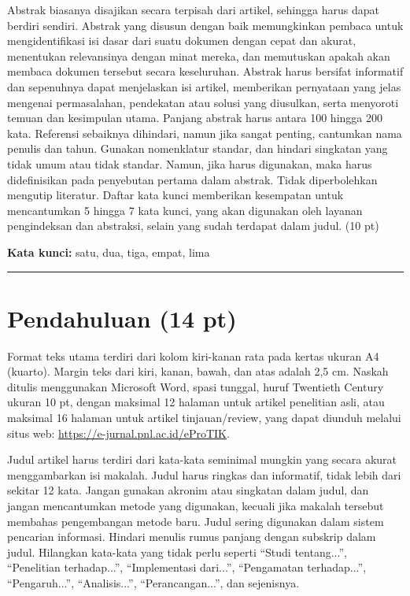 \documentclass[10pt,a4paper]{article}
\begin{document}
{\fontsize{10pt}{13pt}\selectfont
Abstrak biasanya disajikan secara terpisah dari artikel, sehingga harus dapat berdiri sendiri. Abstrak yang disusun dengan baik memungkinkan pembaca untuk mengidentifikasi isi dasar dari suatu dokumen dengan cepat dan akurat, menentukan relevansinya dengan minat mereka, dan memutuskan apakah akan membaca dokumen tersebut secara keseluruhan. Abstrak harus bersifat informatif dan sepenuhnya dapat menjelaskan isi artikel, memberikan pernyataan yang jelas mengenai permasalahan, pendekatan atau solusi yang diusulkan, serta menyoroti temuan dan kesimpulan utama. Panjang abstrak harus antara 100 hingga 200 kata. Referensi sebaiknya dihindari, namun jika sangat penting, cantumkan nama penulis dan tahun. Gunakan nomenklatur standar, dan hindari singkatan yang tidak umum atau tidak standar. Namun, jika harus digunakan, maka harus didefinisikan pada penyebutan pertama dalam abstrak. Tidak diperbolehkan mengutip literatur. Daftar kata kunci memberikan kesempatan untuk mencantumkan 5 hingga 7 kata kunci, yang akan digunakan oleh layanan pengindeksan dan abstraksi, selain yang sudah terdapat dalam judul. (10 pt)\par}

\vspace{5pt}
{\fontsize{10pt}{12pt}\selectfont\textbf{Kata kunci:} satu, dua, tiga, empat, lima\par}

\vspace{4pt}
\noindent\rule{\textwidth}{0.4pt}
\vspace{6pt}

\section{Pendahuluan (14 pt)}

Format teks utama terdiri dari kolom kiri-kanan rata pada kertas ukuran A4 (kuarto). Margin teks dari kiri, kanan, bawah, dan atas adalah 2,5 cm. Naskah ditulis menggunakan Microsoft Word, spasi tunggal, huruf Twentieth Century ukuran 10 pt, dengan maksimal 12 halaman untuk artikel penelitian asli, atau maksimal 16 halaman untuk artikel tinjauan/review, yang dapat diunduh melalui situs web: \url{https://e-jurnal.pnl.ac.id/eProTIK}.

Judul artikel harus terdiri dari kata-kata seminimal mungkin yang secara akurat menggambarkan isi makalah. Judul harus ringkas dan informatif, tidak lebih dari sekitar 12 kata. Jangan gunakan akronim atau singkatan dalam judul, dan jangan mencantumkan metode yang digunakan, kecuali jika makalah tersebut membahas pengembangan metode baru. Judul sering digunakan dalam sistem pencarian informasi. Hindari menulis rumus panjang dengan subskrip dalam judul. Hilangkan kata-kata yang tidak perlu seperti ``Studi tentang...'', ``Penelitian terhadap...'', ``Implementasi dari...'', ``Pengamatan terhadap...'', ``Pengaruh...'', ``Analisis...'', ``Perancangan...'', dan sejenisnya.
\end{document}
